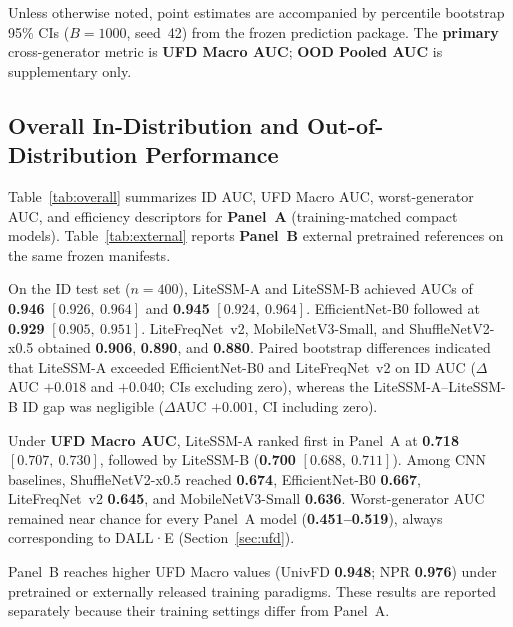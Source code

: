 Unless otherwise noted, point estimates are accompanied by percentile bootstrap 95\% CIs ($B=1000$, seed~42) from the frozen prediction package.
The \textbf{primary} cross-generator metric is \textbf{UFD Macro AUC}; \textbf{OOD Pooled AUC} is supplementary only.

\subsection{Overall In-Distribution and Out-of-Distribution Performance}
\label{sec:overall}

Table~\ref{tab:overall} summarizes ID AUC, UFD Macro AUC, worst-generator AUC, and efficiency descriptors for \textbf{Panel~A} (training-matched compact models).
Table~\ref{tab:external} reports \textbf{Panel~B} external pretrained references on the same frozen manifests.

On the ID test set ($n=400$), LiteSSM-A and LiteSSM-B achieved AUCs of \textbf{0.946} $[0.926,\ 0.964]$ and \textbf{0.945} $[0.924,\ 0.964]$.
EfficientNet-B0 followed at \textbf{0.929} $[0.905,\ 0.951]$.
LiteFreqNet~v2, MobileNetV3-Small, and ShuffleNetV2-x0.5 obtained \textbf{0.906}, \textbf{0.890}, and \textbf{0.880}.
Paired bootstrap differences indicated that LiteSSM-A exceeded EfficientNet-B0 and LiteFreqNet~v2 on ID AUC ($\Delta$AUC $+0.018$ and $+0.040$; CIs excluding zero), whereas the LiteSSM-A--LiteSSM-B ID gap was negligible ($\Delta$AUC $+0.001$, CI including zero).

Under \textbf{UFD Macro AUC}, LiteSSM-A ranked first in Panel~A at \textbf{0.718} $[0.707,\ 0.730]$, followed by LiteSSM-B (\textbf{0.700} $[0.688,\ 0.711]$).
Among CNN baselines, ShuffleNetV2-x0.5 reached \textbf{0.674}, EfficientNet-B0 \textbf{0.667}, LiteFreqNet~v2 \textbf{0.645}, and MobileNetV3-Small \textbf{0.636}.
Worst-generator AUC remained near chance for every Panel~A model (\textbf{0.451--0.519}), always corresponding to DALL·E (Section~\ref{sec:ufd}).

Panel~B reaches higher UFD Macro values (UnivFD \textbf{0.948}; NPR \textbf{0.976}) under pretrained or externally released training paradigms.
These results are reported separately because their training settings differ from Panel~A.


